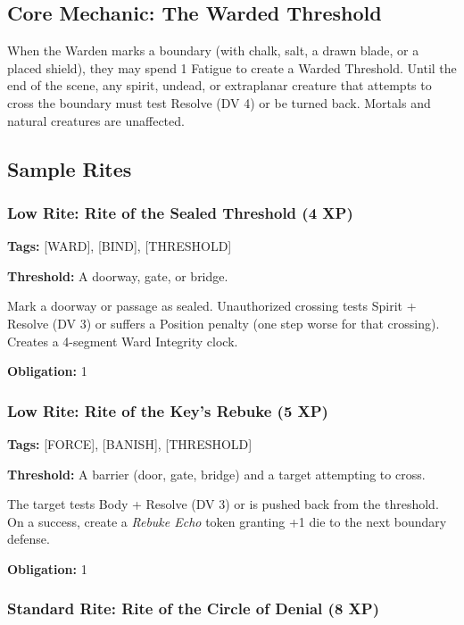 \subsection{Core Mechanic: The Warded Threshold}

When the Warden marks a boundary (with chalk, salt, a drawn blade, or a placed shield), they may spend 1 Fatigue to create a Warded Threshold. Until the end of the scene, any spirit, undead, or extraplanar creature that attempts to cross the boundary must test Resolve (DV 4) or be turned back. Mortals and natural creatures are unaffected.

\subsection{Sample Rites}

\subsubsection{Low Rite: Rite of the Sealed Threshold (4 XP)}

\textbf{Tags:} [WARD], [BIND], [THRESHOLD]

\textbf{Threshold:} A doorway, gate, or bridge.

Mark a doorway or passage as sealed. Unauthorized crossing tests Spirit + Resolve (DV 3) or suffers a Position penalty (one step worse for that crossing). Creates a 4-segment Ward Integrity clock.

\textbf{Obligation:} 1

\subsubsection{Low Rite: Rite of the Key's Rebuke (5 XP)}

\textbf{Tags:} [FORCE], [BANISH], [THRESHOLD]

\textbf{Threshold:} A barrier (door, gate, bridge) and a target attempting to cross.

The target tests Body + Resolve (DV 3) or is pushed back from the threshold. On a success, create a \textit{Rebuke Echo} token granting +1 die to the next boundary defense.

\textbf{Obligation:} 1

\subsubsection{Standard Rite: Rite of the Circle of Denial (8 XP)}

